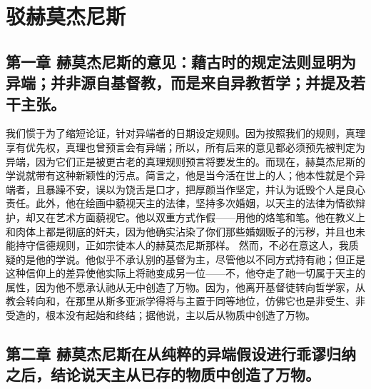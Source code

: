 
\chapter{驳赫莫杰尼斯}



\section{第一章 赫莫杰尼斯的意见：藉古时的规定法则显明为异端；并非源自基督教，而是来自异教哲学；并提及若干主张。}

我们惯于为了缩短论证，针对异端者的日期设定规则。因为按照我们的规则，真理享有优先权，真理也曾预言会有异端；所以，所有后来的意见都必须预先被判定为异端，因为它们正是被更古老的真理规则预言将要发生的。而现在，赫莫杰尼斯的学说就带有这种新颖性的污点。简言之，他是当今活在世上的人；他本性就是个异端者，且暴躁不安，误以为饶舌是口才，把厚颜当作坚定，并认为诋毁个人是良心责任。此外，他在绘画中藐视天主的法律，坚持多次婚姻，以天主的法律为情欲辩护，却又在艺术方面藐视它。他以双重方式作假——用他的烙笔和笔。他在教义上和肉体上都是彻底的奸夫，因为他确实沾染了你们那些婚姻贩子的污秽，并且也未能持守信德规则，正如宗徒本人的赫莫杰尼斯那样。 然而，不必在意这人，我质疑的是他的学说。他似乎不承认别的基督为主，尽管他以不同方式持有祂；但正是这种信仰上的差异使他实际上将祂变成另一位——不，他夺走了祂一切属于天主的属性，因为他不愿承认祂从无中创造了万物。因为，他离开基督徒转向哲学家，从教会转向和，在那里从斯多亚派学得将与主置于同等地位，仿佛它也是非受生、非受造的，根本没有起始和终结；据他说，主以后从物质中创造了万物。\par


\section{第二章 赫莫杰尼斯在从纯粹的异端假设进行乖谬归纳之后，结论说天主从已存的物质中创造了万物。}

